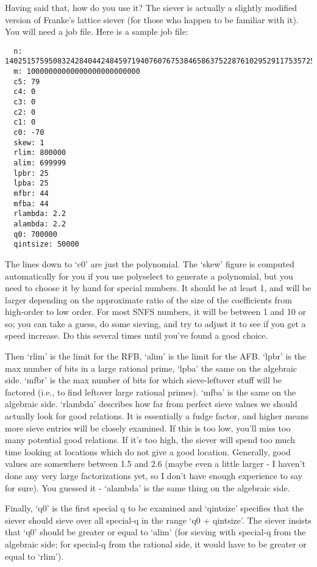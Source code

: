 \documentclass[12pt]{article}
\begin{document}
  Having said that, how do you use it? The siever is actually a slightly modified
  version of Franke's lattice siever (for those who happen to be familiar
  with it). You will need a job file. Here is a sample job file:
  \begin{verbatim}
  n: 1402515759508324284044248459719407607675384658637522876102952911753572573612421171468891326786545449471
  m: 10000000000000000000000000
  c5: 79
  c4: 0
  c3: 0
  c2: 0
  c1: 0
  c0: -70
  skew: 1
  rlim: 800000
  alim: 699999
  lpbr: 25
  lpba: 25
  mfbr: 44
  mfba: 44
  rlambda: 2.2
  alambda: 2.2
  q0: 700000
  qintsize: 50000
  \end{verbatim}
  The lines down to `c0' are just the polynomial. The `skew' figure is computed
  automatically for you if you use polyselect to generate a polynomial, but
  you need to choose it by hand for special numbers. It should be at least 1,
  and will be larger depending on the approximate ratio of the size of the
  coefficients from high-order to low order. For most SNFS numbers, it will be between
  1 and 10 or so; you can take a guess, do some sieving, and try to adjust it to
  see if you get a speed increase. Do this several times until you've found a good
  choice.

    Then `rlim' is the limit for the RFB, `alim' is the limit for the AFB.
  `lpbr' is the max number of bits in a large rational prime, `lpba' the
  same on the algebraic side. `mfbr' is the max number of bits for which sieve-leftover
  stuff will be factored (i.e., to find leftover large rational primes). 
  `mfba' is the same on the algebraic side. `rlambda' describes how far from perfect
  sieve values we should actually look for good relations. It is essentially
  a fudge factor, and higher means more sieve entries will be closely examined.
  If this is too low, you'll miss too many potential good relations. If it's too
  high, the siever will spend too much time looking at locations which do not
  give a good location. Generally, good values are somewhere between 1.5 and 2.6
  (maybe even a little larger - I haven't done any very large factorizations yet,
  so I don't have enough experience to say for sure). You guessed it - `alambda'
  is the same thing on the algebraic side.

  Finally, `q0' is the first special q to be examined and `qintsize' specifies that
  the siever should sieve over all special-q in the range `q0 + qintsize'.
  The siever insists that `q0' should be greater or equal to `alim' (for sieving
  with special-q from the algebraic side; for special-q from the rational side,
  it would have to be greater or equal to `rlim').
 
\end{document}
